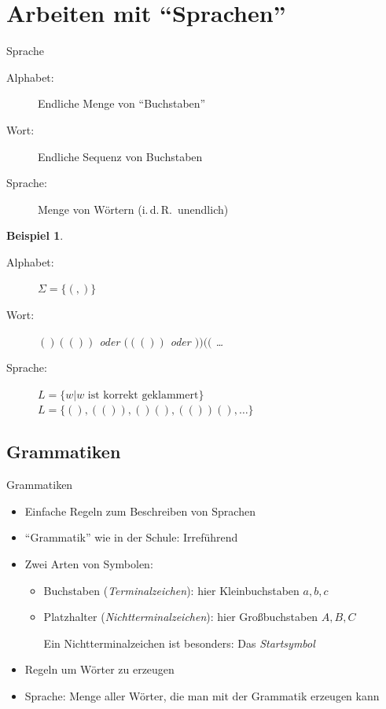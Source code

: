\documentclass{beamer}
\theoremstyle{example}
\newtheorem{ex}{Beispiel}
\renewenvironment{example}{\begin{ex}}{\end{ex}}
\begin{document}
\section{Arbeiten mit ``Sprachen''}
\begin{frame}{Sprache}
  \begin{definition}
    \begin{description}
    \item[Alphabet:] Endliche Menge von ``Buchstaben''
    \item[Wort:] Endliche Sequenz von Buchstaben
    \item[Sprache:] Menge von Wörtern (i.\,d.\,R.\ unendlich)
    \end{description}
  \end{definition}\pause
  \begin{example}
    \begin{description}
    \item[Alphabet:] $\Sigma = \{ (,)\}$
    \item[Wort:] $()(())$ oder $((())$ oder $))(($ \ldots
    \item[Sprache:] $L=\{w | \text{$w$ ist korrekt geklammert}\}$
      $L = \{(),(()),()(),(())(),\ldots\}$
    \end{description}
  \end{example}
\end{frame}

\subsection{Grammatiken}
\begin{frame}{Grammatiken}
  \begin{itemize}
  \item Einfache Regeln zum Beschreiben von Sprachen\pause
  \item ``Grammatik'' wie in der Schule: Irreführend\pause
  \item Zwei Arten von Symbolen:\pause
    \begin{itemize}
    \item Buchstaben (\emph{Terminalzeichen}): hier Kleinbuchstaben $a,b,c$
    \item Platzhalter (\emph{Nichtterminalzeichen}): hier Großbuchstaben $A,B,C$
\pause\par
      Ein Nichtterminalzeichen ist besonders: Das \emph{Startsymbol}\pause
    \end{itemize}
  \item Regeln um Wörter zu erzeugen\pause
  \item Sprache: Menge aller Wörter, die man mit der Grammatik erzeugen kann
  \end{itemize}
\end{frame}
\end{document}
